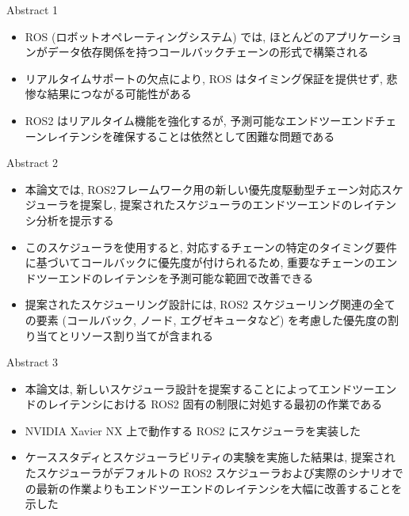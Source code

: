 
\begin{frame}{Abstract 1}
    \begin{itemize}
        \item ROS (ロボットオペレーティングシステム) では, ほとんどのアプリケーションがデータ依存関係を持つコールバックチェーンの形式で構築される
        \item リアルタイムサポートの欠点により, ROS はタイミング保証を提供せず, 悲惨な結果につながる可能性がある
        \item ROS2 はリアルタイム機能を強化するが, 予測可能なエンドツーエンドチェーンレイテンシを確保することは依然として困難な問題である
    \end{itemize}
\end{frame}

\begin{frame}{Abstract 2}
    \begin{itemize}
        \item 本論文では, ROS2フレームワーク用の新しい優先度駆動型チェーン対応スケジューラを提案し, 提案されたスケジューラのエンドツーエンドのレイテンシ分析を提示する
        \item このスケジューラを使用すると, 対応するチェーンの特定のタイミング要件に基づいてコールバックに優先度が付けられるため, 重要なチェーンのエンドツーエンドのレイテンシを予測可能な範囲で改善できる
        \item 提案されたスケジューリング設計には, ROS2 スケジューリング関連の全ての要素 (コールバック, ノード, エグゼキュータなど) を考慮した優先度の割り当てとリソース割り当てが含まれる
    \end{itemize}
\end{frame}

\begin{frame}{Abstract 3}
    \begin{itemize}
        \item 本論文は, 新しいスケジューラ設計を提案することによってエンドツーエンドのレイテンシにおける ROS2 固有の制限に対処する最初の作業である
        \item NVIDIA Xavier NX 上で動作する ROS2 にスケジューラを実装した
        \item ケーススタディとスケジューラビリティの実験を実施した結果は, 提案されたスケジューラがデフォルトの ROS2 スケジューラおよび実際のシナリオでの最新の作業よりもエンドツーエンドのレイテンシを大幅に改善することを示した
    \end{itemize}
\end{frame}
